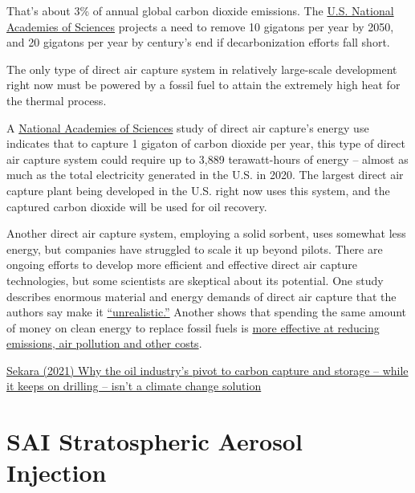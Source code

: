 \documentclass[
]{book}
\begin{document}
That's about 3\% of annual global carbon dioxide emissions. The \href{https://www.nap.edu/catalog/25259/negative-emissions-technologies-and-reliable-sequestration-a-research-agenda}{U.S. National Academies of Sciences} projects a need to remove 10 gigatons per year by 2050, and 20 gigatons per year by century's end if decarbonization efforts fall short.

The only type of direct air capture system in relatively large-scale development right now must be powered by a fossil fuel to attain the extremely high heat for the thermal process.

A \href{https://www.nap.edu/catalog/25259/negative-emissions-technologies-and-reliable-sequestration-a-research-agenda}{National Academies of Sciences} study of direct air capture's energy use indicates that to capture 1 gigaton of carbon dioxide per year, this type of direct air capture system could require up to 3,889 terawatt-hours of energy -- almost as much as the total electricity generated in the U.S. in 2020. The largest direct air capture plant being developed in the U.S. right now uses this system, and the captured carbon dioxide will be used for oil recovery.

Another direct air capture system, employing a solid sorbent, uses somewhat less energy, but companies have struggled to scale it up beyond pilots. There are ongoing efforts to develop more efficient and effective direct air capture technologies, but some scientists are skeptical about its potential. One study describes enormous material and energy demands of direct air capture that the authors say make it \href{https://doi.org/10.1038/s41467-020-17203-7}{``unrealistic.''} Another shows that spending the same amount of money on clean energy to replace fossil fuels is \href{https://research.american.edu/carbonremoval/2019/11/13/jacobson-mark-2019-why-carbon-capture-and-direct-air-capture-cause-more-damage-than-good-to-climate-and-health/}{more effective at reducing emissions, air pollution and other costs}.

\href{https://theconversation.com/why-the-oil-industrys-pivot-to-carbon-capture-and-storage-while-it-keeps-on-drilling-isnt-a-climate-change-solution-171791}{Sekara (2021) Why the oil industry's pivot to carbon capture and storage -- while it keeps on drilling -- isn't a climate change solution}

\hypertarget{sai-stratospheric-aerosol-injection}{%
\chapter{SAI Stratospheric Aerosol Injection}\label{sai-stratospheric-aerosol-injection}}
\end{document}
